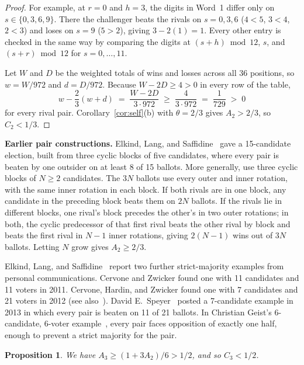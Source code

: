 \documentclass[11pt,letterpaper]{article}
\theoremstyle{cleanthm}
\newtheorem{proposition}[lemma]{Proposition}
\newcommand{\lead}[1]{\textbf{#1}\enspace}
\begin{document}
\begin{proof}
For example, at \(r=0\) and \(h=3\), the digits in Word~1 differ only on \(s\in\{0,3,6,9\}\).
There the challenger beats the rivals on \(s=0,3,6\) (\(4<5\), \(3<4\), \(2<3\)) and loses on
\(s=9\) (\(5>2\)), giving \(3-2(1)=1\). Every other entry is checked in the same way by comparing
the digits at \((s+h)\bmod 12\), \(s\), and \((s+r)\bmod 12\) for \(s=0,\ldots,11\).

Let \(W\) and \(D\) be the weighted totals of wins and losses across all \(36\) positions, so
\(w=W/972\) and \(d=D/972\). Because \(W-2D\ge 4>0\) in every row of the table,
\[
 w - \frac{2}{3}(w+d) \;=\; \frac{W-2D}{3\cdot 972} \;\ge\; \frac{4}{3\cdot 972} \;=\;
 \frac{1}{729} \;>\; 0
\]
for every rival pair. Corollary~\ref{cor:self}(b) with \(\theta=2/3\) gives \(A_2>2/3\), so
\(C_2<1/3\).
\end{proof}

\newpage
\lead{Earlier pair constructions.}
Elkind, Lang, and Saffidine~\cite[Proposition~6]{els11} gave a 15-candidate election, built from
three cyclic blocks of five candidates, where every pair is beaten by one outsider on at least 8
of 15 ballots. More generally, use three cyclic blocks of \(N\ge2\) candidates. The \(3N\) ballots
use every outer and inner rotation, with the same inner rotation in each block. If both rivals are
in one block, any candidate in the preceding block beats them on \(2N\) ballots. If the rivals lie
in different blocks, one rival's block precedes the other's in two outer rotations; in both, the
cyclic predecessor of that first rival beats the other rival by block and beats the first rival in
\(N-1\) inner rotations, giving \(2(N-1)\) wins out of \(3N\) ballots. Letting \(N\) grow gives
\(A_2\ge 2/3\).

Elkind, Lang, and Saffidine~\cite[pp.~500, 516]{els} report two further strict-majority examples
from personal communications. Cervone and Zwicker found one with 11 candidates and 11 voters in
2011. Cervone, Hardin, and Zwicker found one with 7 candidates and 21 voters in 2012 (see
also~\cite{chz}). David E.~Speyer~\cite{speyer} posted a 7-candidate example in 2013 in which
every pair is beaten on 11 of 21 ballots. In Christian Geist's 6-candidate, 6-voter
example~\cite[Fig.~2]{geist}, every pair faces opposition of exactly one half, enough to prevent a
strict majority for the pair.

\begin{proposition}\label{prop:triple-half}
We have \(A_3\ge (1+3A_2)/6 > 1/2\), and so \(C_3<1/2\).
\end{proposition}
\end{document}
